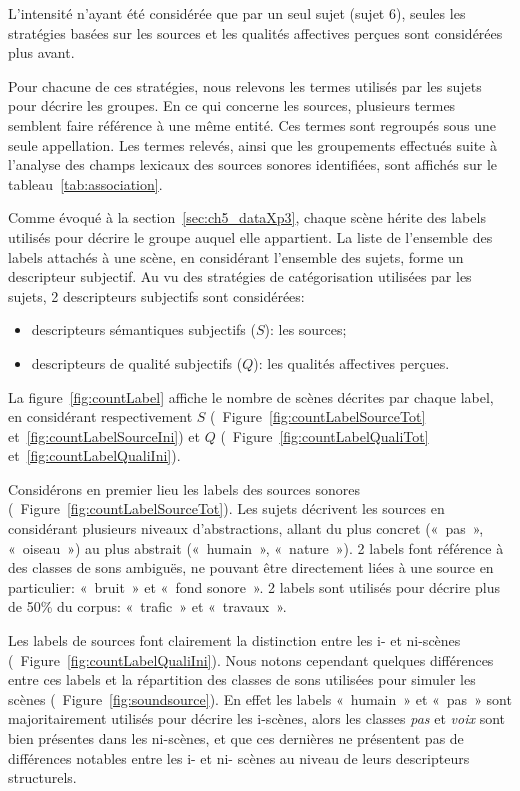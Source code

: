 L'intensité n'ayant été considérée que par un seul sujet (sujet 6), seules les stratégies basées sur les sources et les qualités affectives perçues sont considérées plus avant.

Pour chacune de ces stratégies, nous relevons les termes utilisés par les sujets pour décrire les groupes. En ce qui concerne les sources, plusieurs termes semblent faire référence à une même entité. Ces termes sont regroupés sous une seule appellation. Les termes relevés, ainsi que les groupements effectués suite à l'analyse des champs lexicaux des sources sonores identifiées, sont affichés sur le tableau~\ref{tab:association}.

Comme évoqué à la section~\ref{sec:ch5_dataXp3}, chaque scène hérite des labels utilisés pour décrire le groupe auquel elle appartient. La liste de l'ensemble des labels attachés à une scène, en considérant l'ensemble des sujets, forme un descripteur subjectif. Au vu des stratégies de catégorisation utilisées par les sujets, 2 descripteurs subjectifs sont considérées:

\begin{itemize}
\item descripteurs sémantiques subjectifs ($S$): les sources;
\item descripteurs de qualité subjectifs ($Q$): les qualités affectives perçues.
\end{itemize}

La figure~\ref{fig:countLabel} affiche le nombre de scènes décrites par chaque label, en considérant respectivement $S$ (\cf~Figure~\ref{fig:countLabelSourceTot} et~\ref{fig:countLabelSourceIni}) et $Q$ (\cf~Figure~\ref{fig:countLabelQualiTot} et~\ref{fig:countLabelQualiIni}).

Considérons en premier lieu les labels des sources sonores (\cf~Figure~\ref{fig:countLabelSourceTot}). Les sujets décrivent les sources en considérant plusieurs niveaux d'abstractions, allant du plus concret («~pas~», «~oiseau~») au plus abstrait («~humain~», «~nature~»). 2 labels font référence à des classes de sons ambiguës, ne pouvant être directement liées à une source en particulier: «~bruit~» et «~fond sonore~». 2 labels sont utilisés pour décrire plus de 50\% du corpus: «~trafic~» et «~travaux~». 

Les labels de sources font clairement la distinction entre les i- et ni-scènes (\cf~Figure~\ref{fig:countLabelQualiIni}). Nous notons cependant quelques différences entre ces labels et la répartition des classes de sons utilisées pour simuler les scènes (\cf~Figure~\ref{fig:soundsource}). En effet les labels «~humain~» et «~pas~» sont majoritairement utilisés pour décrire les i-scènes, alors les classes \emph{pas} et \emph{voix} sont bien présentes dans les ni-scènes, et que ces dernières ne présentent pas de différences notables entre les i- et ni- scènes au niveau de leurs descripteurs structurels. 


